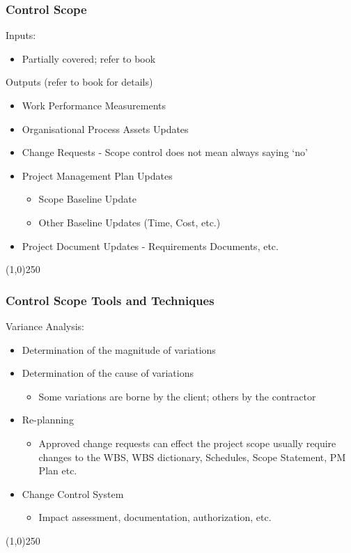 \begin{frame}
\frametitle{Control Scope}
Inputs:
\begin{itemize}
	\item Partially covered; refer to book
\end{itemize}
Outputs (refer to book for details)
\begin{itemize}
	\item Work Performance Measurements
	\item Organisational Process Assets Updates
	\item Change Requests - Scope control does not mean always saying `no'
	\item Project Management Plan Updates
		\begin{itemize}
			\item Scope Baseline Update
			\item Other Baseline Updates (Time, Cost, etc.)
		\end{itemize}
	\item Project Document Updates - Requirements Documents, etc.
\end{itemize}
\end{frame}\begin{center}\line(1,0){250}\end{center}



\begin{frame}
\frametitle{Control Scope \hfill Tools and Techniques}
Variance Analysis:
\begin{itemize}
	\item Determination of the magnitude of variations
	\item Determination of the cause of variations
		\begin{itemize}
			\item Some variations are borne by the client; others by the contractor
		\end{itemize}
	\item Re-planning
		\begin{itemize}
			\item Approved change requests can effect the project scope usually require changes to the WBS, WBS dictionary, Schedules, Scope Statement, PM Plan etc.
		\end{itemize}
	\item Change Control System
		\begin{itemize}
			\item Impact assessment, documentation, authorization, etc.
		\end{itemize}
\end{itemize}
\end{frame}\begin{center}\line(1,0){250}\end{center}




